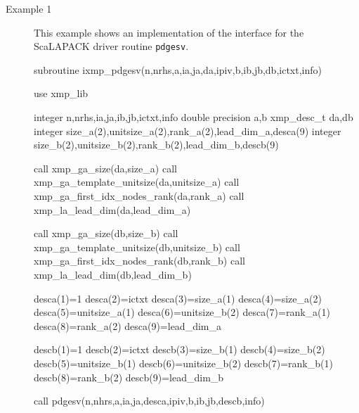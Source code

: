 
\begin{description}

 \item[Example 1]
	    This example shows an implementation of the interface for
	    the ScaLAPACK driver routine {\tt pdgesv}.

\begin{XFexample}
      subroutine ixmp_pdgesv(n,nrhs,a,ia,ja,da,ipiv,b,ib,jb,db,ictxt,info)

      use xmp_lib

      integer n,nrhs,ia,ja,ib,jb,ictxt,info
      double precision a,b
      xmp_desc_t da,db
      integer size_a(2),unitsize_a(2),rank_a(2),lead_dim_a,desca(9)
      integer size_b(2),unitsize_b(2),rank_b(2),lead_dim_b,descb(9)
      
      call xmp_ga_size(da,size_a)
      call xmp_ga_template_unitsize(da,unitsize_a)
      call xmp_ga_first_idx_nodes_rank(da,rank_a)
      call xmp_la_lead_dim(da,lead_dim_a)
      
      call xmp_ga_size(db,size_b)
      call xmp_ga_template_unitsize(db,unitsize_b)
      call xmp_ga_first_idx_nodes_rank(db,rank_b)
      call xmp_la_lead_dim(db,lead_dim_b)
      
      desca(1)=1
      desca(2)=ictxt
      desca(3)=size_a(1)
      desca(4)=size_a(2)
      desca(5)=unitsize_a(1)
      desca(6)=unitsize_b(2)
      desca(7)=rank_a(1)
      desca(8)=rank_a(2)
      desca(9)=lead_dim_a
      
      descb(1)=1
      descb(2)=ictxt
      descb(3)=size_b(1)
      descb(4)=size_b(2)
      descb(5)=unitsize_b(1)
      descb(6)=unitsize_b(2)
      descb(7)=rank_b(1)
      descb(8)=rank_b(2)
      descb(9)=lead_dim_b
      
      call pdgesv(n,nhrs,a,ia,ja,desca,ipiv,b,ib,jb,descb,info)
      

\end{XFexample}
\end{description}
